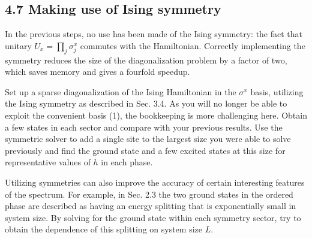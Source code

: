 \documentclass[12pt]{article}
\begin{document}
\subsection*{4.7 Making use of Ising symmetry}
In the previous steps, no use has been made of the Ising symmetry: the fact that unitary $U_{x}=\prod_{j} \sigma_{j}^{x}$ commutes with the Hamiltonian. Correctly implementing the symmetry reduces the size of the diagonalization problem by a factor of two, which saves memory and gives a fourfold speedup.

Set up a sparse diagonalization of the Ising Hamiltonian in the $\sigma^{x}$ basis, utilizing the Ising symmetry as described in Sec. 3.4. As you will no longer be able to exploit the convenient basis (1), the bookkeeping is more challenging here. Obtain a few states in each sector and compare with your previous results. Use the symmetric solver to add a single site to the largest size you were able to solve previously and find the ground state and a few excited states at this size for representative values of $h$ in each phase.

Utilizing symmetries can also improve the accuracy of certain interesting features of the spectrum. For example, in Sec. 2.3 the two ground states in the ordered phase are described as having an energy splitting that is exponentially small in system size. By solving for the ground state within each symmetry sector, try to obtain the dependence of this splitting on system size $L$.
\newpage
\end{document}
